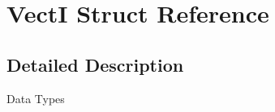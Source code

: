 \hypertarget{structVectI}{\section{Vect\-I Struct Reference}
\label{structVectI}
}


\subsection{Detailed Description}
Data Types 